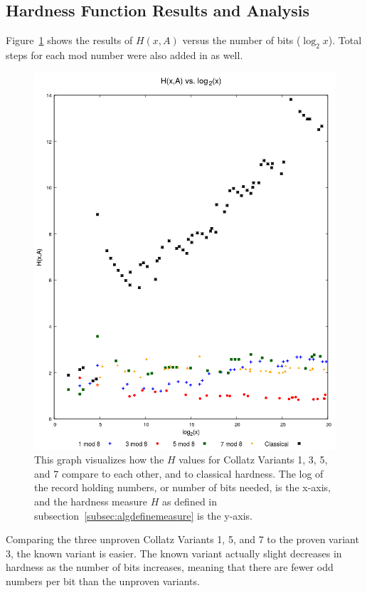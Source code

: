 \subsection{Hardness Function Results and Analysis} \label{subsubsec:algsinhardness}
Figure~\ref{fig:hvslog} shows the results of $H(x,A)$ versus the number of bits ($\log_2{x}$). Total steps for each mod number were also added in as well.\par
\begin{figure}
    \centering
    \includegraphics[scale=0.75]{ModAvoidanceAnalysisPics/H_vs_log.png}
    \caption{This graph visualizes how the $H$ values for Collatz Variants 1, 3, 5, and 7 compare to each other, and to classical hardness. The log of the record holding numbers, or number of bits needed, is the x-axis, and the hardness measure $H$ as defined in subsection~\ref{subsec:algdefinemeasure} is the y-axis.}
    \label{fig:hvslog}
\end{figure}
Comparing the three unproven Collatz Variants 1, 5, and 7 to the proven variant 3, the known variant is easier. The known variant actually slight decreases in hardness as the number of bits increases, meaning that there are fewer odd numbers per bit than the unproven variants. \par

